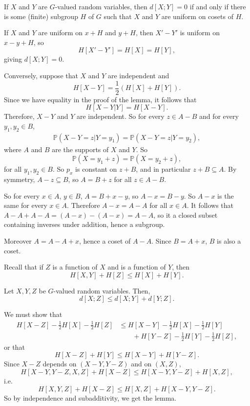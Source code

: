 \documentclass[12pt]{article}
\begin{document}
\begin{lemma}
	If $X$ and $Y$ are $G$-valued random variables, then $d[X; Y] = 0$ if and only if there is some (finite) subgroup $H$ of $G$ such that $X$ and $Y$ are uniform on cosets of $H$.
\end{lemma}

\begin{proofbox}
	If $X$ and $Y$ are uniform on $x + H$ and $y + H$, then $X' - Y'$ is uniform on $x - y + H$, so
	\[
		H[X' - Y'] = H[X] = H[Y],
	\]
	giving $d[X; Y] = 0$.

	Conversely, suppose that $X$ and $Y$ are independent and
	\[
		H[X - Y] = \frac 12 (H[X] + H[Y]).
	\]
	Since we have equality in the proof of the lemma, it follows that
	\[
		H[X - Y|Y] = H[X - Y].
	\]
	Therefore, $X - Y$ and $Y$ are independent. So for every $z \in A - B$ and for every $y_1, y_2 \in B$,
	\begin{align*}
		\mathbb{P}(X -Y = z | Y = y_1) = \mathbb{P}(X - Y = z | Y = y_2),
	\end{align*}
	where $A$ and $B$ are the supports of $X$ and $Y$. So
	\[
	\mathbb{P}(X = y_1 + z) = \mathbb{P}(X = y_2 + z),
	\]
	for all $y_1, y_2 \in B$. So $p_x$ is constant on $z + B$, and in particular $z + B \subseteq A$. By symmetry, $A - z \subseteq B$, so $A = B + z$ for all $z \in A - B$.

	So for every $x \in A$, $y \in B$, $A = B + x - y$, so $A - x = B - y$. So $A - x$ is the same for every $x \in A$. Therefore $A - x = A - A$ for all $x \in A$. It follows that $A - A + A - A = (A - x) - (A - x) = A - A$, so it a closed subset containing inverses under addition, hence a subgroup.

	Moreover $A = A - A + x$, hence a coset of $A - A$. Since $B = A + x$, $B$ is also a coset.
\end{proofbox}

Recall that if $Z$ is a function of $X$ and is a function of $Y$, then
\[
	H[X, Y] + H[Z] \leq H[X] + H[Y].
\]
\begin{lemma}
	Let $X, Y, Z$ be $G$-valued random variables. Then,
	\[
		d[X; Z] \leq d[X; Y] + d[Y; Z].
	\]
\end{lemma}

\begin{proofbox}
	We must show that
	\begin{align*}
		H[X - Z] - \frac 12 H[X] - \frac 12 H[Z] &\leq H[X - Y] - \frac 12 H[X] - \frac 12 H[Y] \\
		& \qquad+ H[Y - Z] - \frac12 H[Y] - \frac 12 H[Z],
	\end{align*}
	or that
	\[
		H[X - Z] + H[Y] \leq H[X - Y] + H[Y - Z].
	\]
	Since $X - Z$ depends on $(X-Y, Y - Z)$ and on $(X, Z)$,
	\[
		H[X- Y, Y - Z, X, Z] + H[X - Z] \leq H[X - Y, Y - Z] + H[X, Z],
	\]
	i.e.
	\[
		H[X, Y, Z] + H[X - Z] \leq H[X, Z] + H[X - Y, Y - Z].
	\]
	So by independence and subadditivity, we get the lemma.
\end{proofbox}
\end{document}
